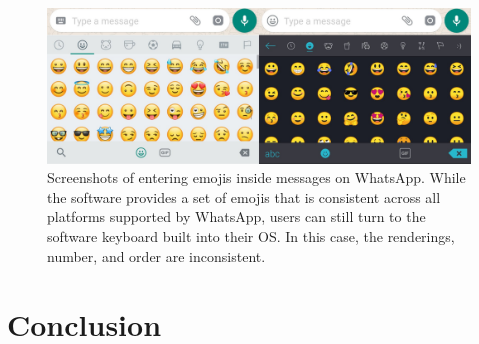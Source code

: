 \begin{figure}
	\centering
	\includegraphics[width=0.7\linewidth]{figures/emojipasswords/app-vs-platform-emojis}
	\caption{\label{fig:emojipasswords.app-vs-platform-emojis}
		Screenshots of entering emojis inside messages on WhatsApp. While the software provides a set of emojis that is consistent across all platforms supported by WhatsApp, users can still turn to the software keyboard built into their OS. In this case, the renderings, number, and order are inconsistent.
	}
\end{figure}








\section{Conclusion}

